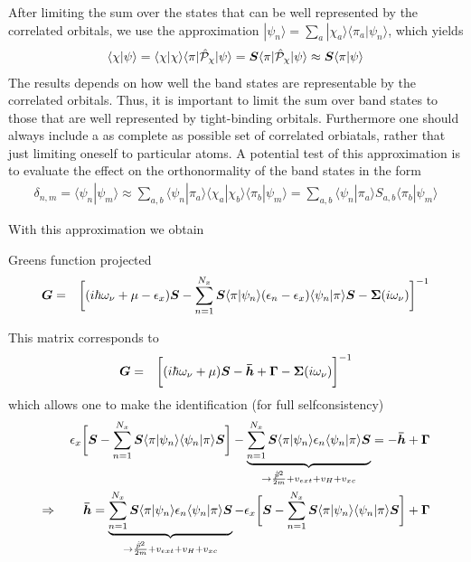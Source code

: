 \documentclass[11pt,a4paper]{report}
\begin{document}
After limiting the sum over the states that can be well represented by
the correlated orbitals, we use the approximation
$|\psi_n\rangle=\sum_a|\chi_a\rangle\langle\pi_a|\psi_n\rangle$, which
yields
\begin{eqnarray}
\langle\chi|\psi\rangle
=\langle\chi|\chi\rangle\langle\pi|\hat{\mathcal{P}}_\chi|\psi\rangle
=\bm{S}\langle\pi|\hat{\mathcal{P}}_\chi|\psi\rangle
\approx 
\bm{S}\langle\pi|\psi\rangle
\end{eqnarray}
The results depends on how well the band states are representable by
the correlated orbitals. Thus, it is important to limit the sum over
band states to those that are well represented by tight-binding
orbitals. Furthermore one should always include a as complete as
possible set of correlated orbiatals, rather that just limiting
oneself to particular atoms. A potential test of this approximation is
to evaluate the effect on the orthonormality of the band states in the
form 
\begin{eqnarray}
\delta_{n,m}=\langle\psi_n|\psi_m\rangle
\approx\sum_{a,b}
\langle\psi_n|\pi_a\rangle\langle\chi_a|\chi_b\rangle\langle\pi_b|\psi_m\rangle
=\sum_{a,b}
\langle\psi_n|\pi_a\rangle S_{a,b} \langle\pi_b|\psi_m\rangle
\end{eqnarray}
  
With this approximation we obtain
\begin{myshadowminipage}{Greens function projected}
\begin{eqnarray}
\bm{G}&=&
\biggl[(i\hbar\omega_\nu+\mu-\epsilon_x)\bm{S}-\sum_{n=1}^{N_x}
\bm{S}\langle\pi|\psi_n\rangle (\epsilon_n-\epsilon_x)\langle\psi_n|\pi\rangle\bm{S}-\bm{\Sigma}(i\omega_\nu)\biggr]^{-1}
\end{eqnarray}
\end{myshadowminipage}

This matrix corresponds to
\begin{eqnarray}
\bm{G}&=&
\biggl[(i\hbar\omega_\nu+\mu)\bm{S}-\bm{\bar{h}}+\bm{\Gamma}
-\bm{\Sigma}(i\omega_\nu)\biggr]^{-1}
\end{eqnarray}
which allows one to make the identification (for full selfconsistency)
\begin{eqnarray}
\epsilon_x
\biggl[\bm{S}
-\sum_{n=1}^{N_x}
\bm{S}\langle\pi|\psi_n\rangle\langle\psi_n|\pi\rangle\bm{S}\biggr]
-
\underbrace{\sum_{n=1}^{N_x}
\bm{S}\langle\pi|\psi_n\rangle\epsilon_n\langle\psi_n|\pi\rangle\bm{S}
}_{\rightarrow \frac{\hat{\vec{p}}^2}{2m}+v_{ext}+v_H+v_{xc}}
=-\bm{\bar{h}}+\bm{\Gamma}
\nonumber\\
\Rightarrow\qquad
\bm{\bar{h}}
=
\underbrace{\sum_{n=1}^{N_x}
\bm{S}\langle\pi|\psi_n\rangle\epsilon_n\langle\psi_n|\pi\rangle\bm{S}
}_{\rightarrow \frac{\hat{\vec{p}}^2}{2m}+v_{ext}+v_H+v_{xc}}
-\epsilon_x
\biggl[\bm{S}
-\sum_{n=1}^{N_x}
\bm{S}\langle\pi|\psi_n\rangle\langle\psi_n|\pi\rangle\bm{S}\biggr]
+\bm{\Gamma}
\end{eqnarray}
\end{document}
